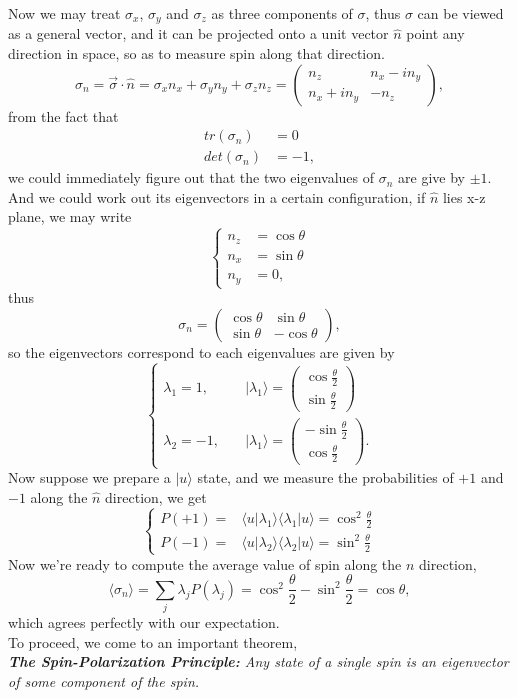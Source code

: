 \documentclass{article}
\newcommand{\be}{\begin{equation}}
\newcommand{\ee}{\end{equation}}
\newcommand{\ba}{\begin{array}}
\newcommand{\ea}{\end{array}}
\newcommand{\bs}{\be\begin{split}}
\renewcommand{\1}{\left}
\renewcommand{\2}{\right}
\newcommand{\la}{\langle}
\newcommand{\ra}{\rangle}
\newcommand{\n}{\nu}
\newcommand{\lam}{\lambda}
\newcommand{\sig}{\sigma}
\begin{document}
Now we may treat $\sig_x$, $\sig_y$ and $\sig_z$ as three components of $\sig$, thus $\sig$ can be viewed as a general vector, and it can be projected onto a unit vector $\hat n$ point any direction in space, so as to measure spin along that direction.
\be
\sig_n=\vec\sig\cdot\hat n=\sig_xn_x+\sig_yn_y+\sig_zn_z=\1(\ba{cc}n_z&n_x-in_y\\n_x+in_y&-n_z\ea\2),
\ee
from the fact that
\bs
tr(\sig_n)&=0\\
det(\sig_n)&=-1,
\end{split}\ee
we could immediately figure out that the two eigenvalues of $\sig_n$ are give by $\pm 1$. And we could work out its eigenvectors in a certain configuration, if $\hat n$ lies x-z plane, we may write
\be\1\{\begin{split}
n_z&=\cos\theta\\
n_x&=\sin\theta\\
n_y&=0,
\end{split}\2.\ee
thus 
\be
\sig_n=\1(\ba{cc}\cos\theta&\sin\theta\\\sin\theta&-\cos\theta\ea\2),
\ee
so the eigenvectors correspond to each eigenvalues are given by
\be\1\{\begin{split}
\lam_1=1, &\quad|\lam_1\ra=\1(\ba{c}\cos{\frac\theta 2}\\\sin{\frac\theta 2}\ea\2)\\
\lam_2=-1, &\quad|\lam_1\ra=\1(\ba{c}-\sin{\frac\theta 2}\\\cos{\frac\theta 2}\ea\2).
\end{split}\2.\ee
Now suppose we prepare a $|u\ra$ state, and we measure the probabilities of $+1$ and $-1$ along the $\hat n$ direction, we get
\be\1\{\begin{split}
P(+1)=&\la u|\lam_1\ra\la\lam_1|u\ra=\cos^2{\frac{\theta}{2}}\\
P(-1)=&\la u|\lam_2\ra\la\lam_2|u\ra=\sin^2{\frac{\theta}{2}}
\end{split}\2.\ee
Now we're ready to compute the average value of spin along the $n$ direction,
\be
\la \sig_n\ra=\sum_j \lam_j P(\lam_j)=\cos^2{\frac{\theta}{2}}-\sin^2{\frac{\theta}{2}}=\cos{\theta},
\ee
which agrees perfectly with our expectation.\\

To proceed, we come to an important theorem,\\

\textit{\textbf{The Spin-Polarization Principle:} Any state of a single spin is an eigenvector of some component of the spin.}\\
\end{document}
